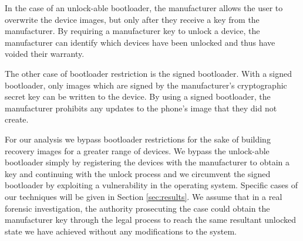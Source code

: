 In the case of an unlock-able bootloader, the manufacturer allows the user to overwrite the device images, but only after they receive a key from the manufacturer.  By requiring a manufacturer key to unlock a device, the manufacturer can identify which devices have been unlocked and thus have voided their warranty. 

The other case of bootloader restriction is the signed bootloader.  With a signed bootloader, only images which are signed by the manufacturer's cryptographic secret key can be written to the device.  By using a signed bootloader, the manufacturer prohibits any updates to the phone's image that they did not create.

For our analysis we bypass bootloader restrictions for the sake of building recovery images for a greater range of devices.  We bypass the unlock-able bootloader simply by registering the devices with the manufacturer to obtain a key and continuing with the unlock process and we circumvent the signed bootloader by exploiting a vulnerability in the operating system.  Specific cases of our techniques will be given in Section \ref{sec:results}.  We assume that in a real forensic investigation, the authority prosecuting the case could obtain the manufacturer key through the legal process to reach the same resultant unlocked state we have achieved without any modifications to the system.
